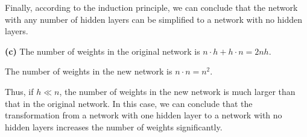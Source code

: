 \documentclass[cn,12pt]{homework}
\begin{document}
\begin{solution}
    Finally, according to the induction principle, we can conclude that the network with any number of hidden layers can be simplified to a network with no hidden layers.

\textbf{(c)}
    The number of weights in the original network is $n \cdot h + h \cdot n = 2nh$.

    The number of weights in the new network is $n \cdot n = n^2$.

    Thus, if $h \ll n$, the number of weights in the new network is much larger than that in the original network. 
    In this case, we can conclude that the transformation from a network with one hidden layer to a network with no hidden layers increases the number of weights significantly.

\end{solution}



\end{document}
